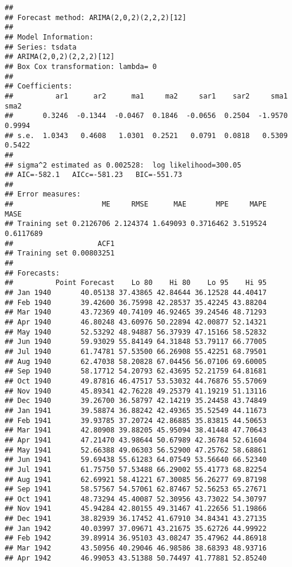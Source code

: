 \documentclass[
]{article}
\begin{document}
\begin{verbatim}
## 
## Forecast method: ARIMA(2,0,2)(2,2,2)[12]
## 
## Model Information:
## Series: tsdata 
## ARIMA(2,0,2)(2,2,2)[12] 
## Box Cox transformation: lambda= 0 
## 
## Coefficients:
##          ar1      ar2      ma1     ma2     sar1    sar2     sma1    sma2
##       0.3246  -0.1344  -0.0467  0.1846  -0.0656  0.2504  -1.9570  0.9994
## s.e.  1.0343   0.4608   1.0301  0.2521   0.0791  0.0818   0.5309  0.5422
## 
## sigma^2 estimated as 0.002528:  log likelihood=300.05
## AIC=-582.1   AICc=-581.23   BIC=-551.73
## 
## Error measures:
##                     ME     RMSE      MAE       MPE     MAPE      MASE
## Training set 0.2126706 2.124374 1.649093 0.3716462 3.519524 0.6117689
##                    ACF1
## Training set 0.00803251
## 
## Forecasts:
##          Point Forecast    Lo 80    Hi 80    Lo 95    Hi 95
## Jan 1940       40.05138 37.43865 42.84644 36.12528 44.40417
## Feb 1940       39.42600 36.75998 42.28537 35.42245 43.88204
## Mar 1940       43.72369 40.74109 46.92465 39.24546 48.71293
## Apr 1940       46.80248 43.60976 50.22894 42.00877 52.14321
## May 1940       52.53292 48.94887 56.37939 47.15166 58.52832
## Jun 1940       59.93029 55.84149 64.31848 53.79117 66.77005
## Jul 1940       61.74781 57.53500 66.26908 55.42251 68.79501
## Aug 1940       62.47038 58.20828 67.04456 56.07106 69.60005
## Sep 1940       58.17712 54.20793 62.43695 52.21759 64.81681
## Oct 1940       49.87816 46.47517 53.53032 44.76876 55.57069
## Nov 1940       45.89341 42.76228 49.25379 41.19219 51.13116
## Dec 1940       39.26700 36.58797 42.14219 35.24458 43.74849
## Jan 1941       39.58874 36.88242 42.49365 35.52549 44.11673
## Feb 1941       39.93785 37.20724 42.86885 35.83815 44.50653
## Mar 1941       42.80908 39.88205 45.95094 38.41448 47.70643
## Apr 1941       47.21470 43.98644 50.67989 42.36784 52.61604
## May 1941       52.66388 49.06303 56.52900 47.25762 58.68861
## Jun 1941       59.69438 55.61283 64.07549 53.56640 66.52340
## Jul 1941       61.75750 57.53488 66.29002 55.41773 68.82254
## Aug 1941       62.69921 58.41221 67.30085 56.26277 69.87198
## Sep 1941       58.57567 54.57061 62.87467 52.56253 65.27671
## Oct 1941       48.73294 45.40087 52.30956 43.73022 54.30797
## Nov 1941       45.94284 42.80155 49.31467 41.22656 51.19866
## Dec 1941       38.82939 36.17452 41.67910 34.84341 43.27135
## Jan 1942       40.03997 37.09671 43.21675 35.62726 44.99922
## Feb 1942       39.89914 36.95103 43.08247 35.47962 44.86918
## Mar 1942       43.50956 40.29046 46.98586 38.68393 48.93716
## Apr 1942       46.99053 43.51388 50.74497 41.77881 52.85240

\end{verbatim}
\end{document}
